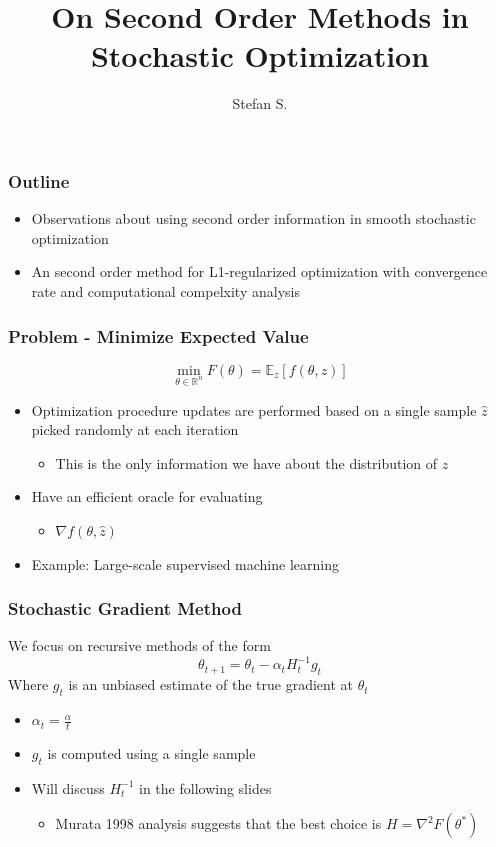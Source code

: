 \documentclass{beamer}
\begin{document}
\title{On Second Order Methods in Stochastic Optimization}
\author{Stefan S.}

\begin{frame}
	\titlepage
\end{frame}	

\begin{frame}
	\frametitle{Outline}
	\begin{itemize}
		\pause
		\item Observations about using second order information in smooth stochastic optimization
		\pause
		\item An second order method for L1-regularized optimization with convergence rate and computational compelxity analysis
	\end{itemize}
\end{frame}	


\begin{frame}
	\frametitle{Problem - Minimize Expected Value}
	\[
		\min_{\theta \in \mathbb{R}^n} F(\theta) = \mathbb{E}_z[ f(\theta,z)]
	\]
	\begin{itemize}
		\pause
		\item Optimization procedure updates are performed based on a single sample $\hat{z}$ picked randomly at each iteration
		\pause
		\begin{itemize}
		\item This is the only information we have about the distribution of $z$
		\end{itemize}
		\pause
		\item Have an efficient oracle for evaluating
		\begin{itemize}
		\item $\nabla f(\theta,\hat{z})$
		\end{itemize}
		\pause
		\item Example: Large-scale supervised machine learning
	\end{itemize}
\end{frame}

\begin{frame}
	\frametitle{Stochastic Gradient Method}
	We focus on recursive methods of the form
	\[
		\theta_{t+1}= \theta_t - \alpha_t H_t^{-1} g_t 
	\]
	Where $g_t$ is an unbiased estimate of the true gradient at $\theta_t$
	\begin{itemize}
		\pause
		\item $\alpha_t = \frac{\alpha}{t}$
		\pause
		\item $g_t$ is computed using a single sample
		\pause
		\item Will discuss $H_t^{-1}$ in the following slides
		\begin{itemize}
			\item Murata 1998 analysis suggests that the best choice is $H =\nabla^2 F(\theta^*) $
		\end{itemize} 
	\end{itemize}
\end{frame}
\end{document}
